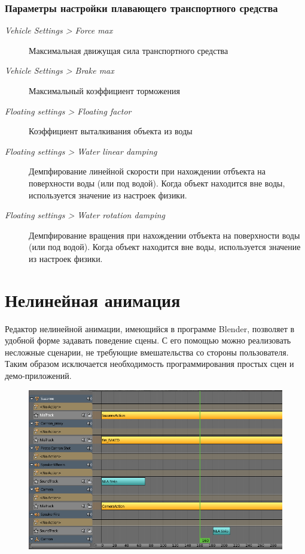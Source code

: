 \documentclass[a4paper,12pt,oneside]{sphinxmanual}
\begin{document}
\subsection{Параметры настройки плавающего транспортного средства}
\label{physics:id10}\begin{description}
\item[{\emph{Vehicle Settings \textgreater{} Force max}}] \leavevmode
Максимальная движущая сила транспортного средства

\item[{\emph{Vehicle Settings \textgreater{} Brake max}}] \leavevmode
Максимальный коэффициент торможения

\item[{\emph{Floating settings \textgreater{} Floating factor}}] \leavevmode
Коэффициент выталкивания объекта из воды

\item[{\emph{Floating settings \textgreater{} Water linear damping}}] \leavevmode
Демпфирование линейной скорости при нахождении отбъекта на поверхности воды (или под водой). Когда объект находится вне воды, используется значение из настроек физики.

\item[{\emph{Floating settings \textgreater{} Water rotation damping}}] \leavevmode
Демпфирование вращения при нахождении отбъекта на поверхности воды (или под водой). Когда объект находится вне воды, используется значение из настроек физики.

\end{description}


\chapter{Нелинейная анимация}
\label{nla:nla}\label{nla::doc}\label{nla:id1}
Редактор нелинейной анимации, имеющийся в программе Blender, позволяет в удобной
форме задавать поведение сцены. С его помощью можно реализовать несложные
сценарии, не требующие вмешательства со стороны пользователя. Таким образом
исключается необходимость программирования простых сцен и демо-приложений.
\begin{figure}[htbp]
\centering

\includegraphics{nla_editor.jpg}
\end{figure}
\end{document}
